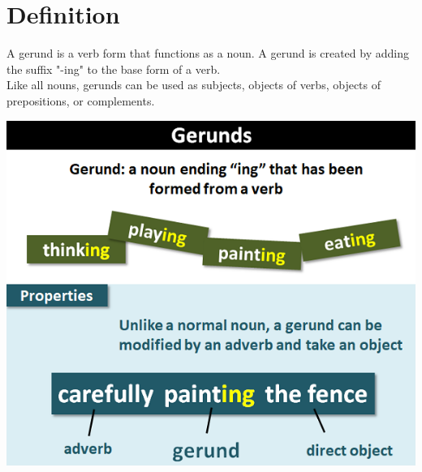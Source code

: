 \chapter{Definition}
A gerund is a verb form that functions as a noun. A gerund is created by adding the suffix "-ing" to the base form of a verb. 
\\Like all nouns, gerunds can be used as subjects, objects of verbs, objects of prepositions, or complements.\\
\begin{center}  
    \includegraphics[scale=0.5]{project-folders/Gerunds/gerunds.png}
\end{center}

